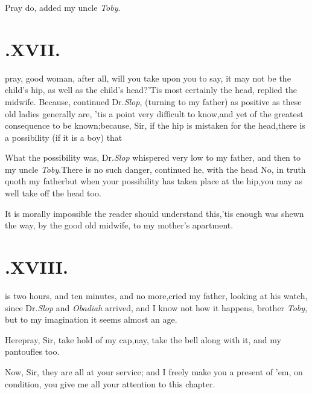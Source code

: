\documentclass{article}
\begin{document}
Pray do, added my uncle \textit{Toby}.

\null
\section{.\quad  XVII.}

 pray, good woman, after all, will
you take upon you to say, it may not be the child’s hip, as well
as the child’s head?\tsh ’Tis most certainly the head, replied
the midwife. Because, continued Dr.\@ \textit{Slop}, (turning to
my father) as positive as these old ladies generally are,\tsh
’tis a point very difficult to know,\tsk and yet of the greatest
consequence to be known;\tsh because, Sir, if the hip is
mistaken for the head,\tsk there is a possibility (if it is a
boy) that\break 
{}

\tsh What the possibility was, Dr.\@ \textit{Slop}
whispered very low to my father, and then to my uncle
\textit{Toby}.\tsh There is no
such danger, continued he, with the head\break
\tsk No, in truth quoth my father\tsk but when
your possibility has taken place at the hip,\tsk you may as well
take off the head too.

\tsh It is morally impossible the reader should understand this,\tsh ’tis
enough\break 
{}
was shewn the way, by the good old mid\-wife, to my
mother’s apartment.

\null
\section{.\quad  XVIII.}

 is two hours, and ten minutes,\tsk\break
and no more,\tsh cried my father, looking at his
watch, since Dr.\@ \textit{Slop} and
\textit{Obadiah} arrived, \tsh and I know not how it happens,
brother \textit{Toby}, \tsh\break but to my imagination it seems
almost an age.

\tsh Here\tsh pray, Sir, take hold of my cap,\tsk nay, take the bell along with it, and my
pantoufles too.\tsh

Now, Sir, they are all at your service; and I freely make you a
present of ’em, on condition, you give me all your attention
to this chapter.
\end{document}
